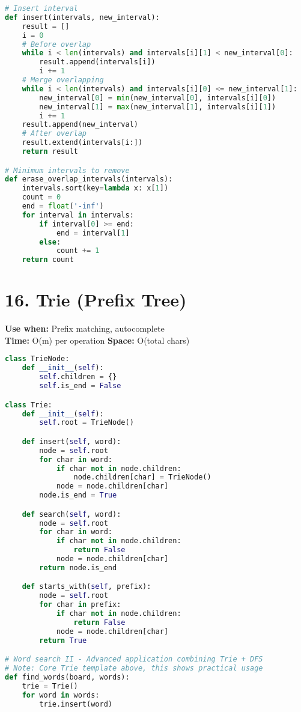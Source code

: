 \documentclass[8pt,landscape]{article}
\begin{document}
\begin{multicols}{3}
\begin{lstlisting}[language=Python]
# Insert interval
def insert(intervals, new_interval):
    result = []
    i = 0
    # Before overlap
    while i < len(intervals) and intervals[i][1] < new_interval[0]:
        result.append(intervals[i])
        i += 1
    # Merge overlapping
    while i < len(intervals) and intervals[i][0] <= new_interval[1]:
        new_interval[0] = min(new_interval[0], intervals[i][0])
        new_interval[1] = max(new_interval[1], intervals[i][1])
        i += 1
    result.append(new_interval)
    # After overlap
    result.extend(intervals[i:])
    return result

# Minimum intervals to remove
def erase_overlap_intervals(intervals):
    intervals.sort(key=lambda x: x[1])
    count = 0
    end = float('-inf')
    for interval in intervals:
        if interval[0] >= end:
            end = interval[1]
        else:
            count += 1
    return count
\end{lstlisting}

\section*{16. Trie (Prefix Tree)}
\textbf{Use when:} Prefix matching, autocomplete \\
\textbf{Time:} O(m) per operation \quad \textbf{Space:} O(total chars)
\begin{lstlisting}[language=Python]
class TrieNode:
    def __init__(self):
        self.children = {}
        self.is_end = False

class Trie:
    def __init__(self):
        self.root = TrieNode()

    def insert(self, word):
        node = self.root
        for char in word:
            if char not in node.children:
                node.children[char] = TrieNode()
            node = node.children[char]
        node.is_end = True

    def search(self, word):
        node = self.root
        for char in word:
            if char not in node.children:
                return False
            node = node.children[char]
        return node.is_end

    def starts_with(self, prefix):
        node = self.root
        for char in prefix:
            if char not in node.children:
                return False
            node = node.children[char]
        return True

# Word search II - Advanced application combining Trie + DFS
# Note: Core Trie template above, this shows practical usage
def find_words(board, words):
    trie = Trie()
    for word in words:
        trie.insert(word)


\end{lstlisting}
\end{multicols}
\end{document}
